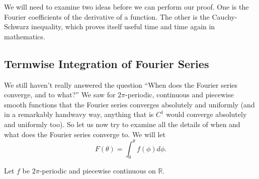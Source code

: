 We will need to examine two ideas before we can perform our
proof. One is the Fourier coefficients of the derivative of
a function. The other is the Cauchy-Schwarz inequality,
which proves itself useful time and time again in mathematics.

\subsection{Termwise Integration of Fourier Series}

We still haven't really answered the question ``When does
the Fourier series converge, and to what?'' We saw for
$2\pi$-periodic, continuous and piecewise smooth functions
that the Fourier series converges absolutely and uniformly
(and in a remarkably handwavy way, anything that is $C^{1}$
would converge absolutely and uniformly too). So let us now
try to examine all the details of when and what does the
Fourier series converge to. We will let
\begin{equation}
F(\theta) = \int^{\theta}_{0}f(\phi)d\phi.
\end{equation}

\begin{assume}
Let $f$ be $2\pi$-periodic and piecewise continuous on $\mathbb{R}$.
\end{assume}


